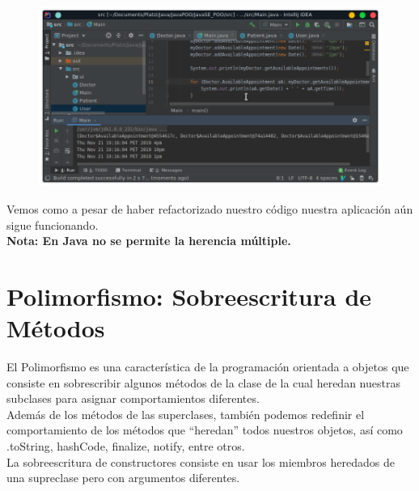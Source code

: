 \documentclass{article}
\begin{document}
\begin{figure}[h!]
  \centering
  \includegraphics[scale=0.5]{./Pictures/042_herencia.png}
\end{figure}

Vemos como a pesar de haber refactorizado nuestro código nuestra aplicación aún
sigue funcionando.\\

\textbf{Nota: En Java no se permite la herencia múltiple.}


\section{Polimorfismo: Sobreescritura de Métodos}%
El Polimorfismo es una característica de la programación orientada a objetos
que consiste en sobrescribir algunos métodos de la clase de la cual heredan
nuestras subclases para asignar comportamientos diferentes.\\

Además de los métodos de las superclases, también podemos redefinir el
comportamiento de los métodos que “heredan” todos nuestros objetos, así como
.toString, hashCode, finalize, notify, entre otros.\\

La sobreescritura de constructores consiste en usar los miembros heredados de
una supreclase pero con argumentos diferentes.\\
\end{document}
